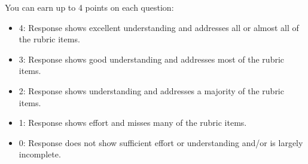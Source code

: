 \documentclass[
  letterpaper,
  DIV=11,
  numbers=noendperiod]{scrartcl}
\begin{document}
You can earn up to 4 points on each question:

\begin{itemize}
\item
  4: Response shows excellent understanding and addresses all or almost
  all of the rubric items.
\item
  3: Response shows good understanding and addresses most of the rubric
  items.
\item
  2: Response shows understanding and addresses a majority of the rubric
  items.
\item
  1: Response shows effort and misses many of the rubric items.
\item
  0: Response does not show sufficient effort or understanding and/or is
  largely incomplete.
\end{itemize}
\end{document}
